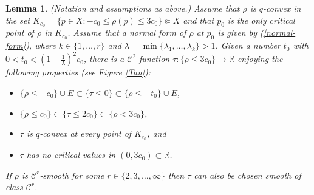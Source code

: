 \documentclass[11pt]{amsart}
\numberwithin{equation}{section}
\newtheorem{lemma}[theorem]{Lemma}
\theoremstyle{definition}
\begin{document}
 
\begin{lemma} 
\label{crossing}
{(Notation and assumptions as above.)} 
Assume that $\rho$ is $q$-convex in the set 
$K_{c_0}= \{p\in X\colon -c_0\le \rho(p) \le 3c_0\} \Subset X$
and that $p_0$ is the only critical point of $\rho$ in $K_{c_0}$.
Assume that a normal form of $\rho$ at $p_0$ is given 
by (\ref{normal-form}), where $k\in \{1,\ldots,r\}$ and 
$\lambda=\min \{{\lambda}_1,\ldots,{\lambda}_k\}>1$.  
Given a number $t_0$ with $0< t_0 < (1-\frac{1}{\lambda})^2c_0$,
there is a ${\mathcal{C}}^2$-function $\tau \colon \{\rho \le 3c_0\} \to{\mathbb{R}}$
enjoying the following properties (see Figure \ref{Tau}):
\begin{itemize}
\item[(i)]   $\{\rho\le -c_0\} \cup E \subset \{\tau\le 0\} \subset \{\rho\le -t_0\}\cup E$, 
\item[(ii)]  $\{\rho \le c_0\} \subset \{\tau \le 2c_0\} \subset \{\rho< 3c_0\}$,
\item[(iii)] $\tau$ is $q$-convex at every point of $K_{c_0}$, and
\item[(iv)]  $\tau$  has no critical values in $(0,3c_0) \subset {\mathbb{R}}$.
\end{itemize}
If $\rho$ is ${\mathcal{C}}^r$-smooth for some $r\in\{2,3,\ldots,\infty\}$
then $\tau$ can also be chosen smooth of class ${\mathcal{C}}^r$.
\end{lemma}
\end{document}
